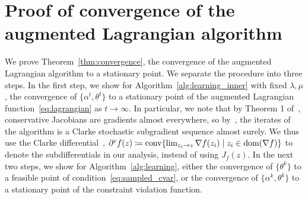 \section{Proof of convergence of the augmented Lagrangian algorithm}
\label{appx:converge_stationary}
We prove Theorem~\ref{thm:convergence}, the convergence of the augmented Lagrangian algorithm to a stationary point.
We separate the procedure into three steps. In the first step, we show for Algorithm~\ref{alg:learning_inner} with fixed $\lambda,\mu$, the convergence of $\{\alpha^t,\theta^t\}$ to a stationary point of the augmented Lagrangian function~\eqref{eq:lagrangian} as $t \to \infty$.
In particular, we note that by Theorem 1 of~\cite{conservative}, conservative Jacobians are gradients almost everywhere, so by~\cite{path-diff}, the iterates of the algorithm is a Clarke stochastic subgradient sequence almost surely. 
We thus use the Clarke differential~\citep{Clarke},
$\partial^cf(z) \coloneqq {\rm conv}\{\lim_{z_i \rightarrow z} \nabla f(z_i) \mid z_i \in {\rm dom}(\nabla f)\}$ to denote the subdifferentials
in our analysis, instead of using $J_f(z)$.
In the next two steps, we show for Algorithm~\ref{alg:learning}, either the convergence of 
$\{\theta^k\}$ to a feasible point of condition~\eqref{eq:sampled_cvar}, or the convergence of $\{\alpha^k,\theta^k\}$ to a stationary point of the constraint violation function. 

